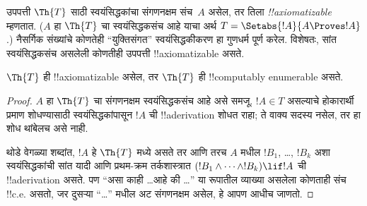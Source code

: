\documentclass[../../../include/open-logic-section]{subfiles}
\begin{document}


उपपत्ती $\Th{T}$ साठी स्वयंसिद्धकांचा संगणनक्षम संच~$A$ असेल,
तर तिला \emph{!!{axiomatizable}} म्हणतात.
($A$ हा $\Th{T}$ चा स्वयंसिद्धकसंच आहे याचा अर्थ
$T = \Setabs{!A}{A \Proves !A}$.) नैसर्गिक संख्यांचे कोणतेही
``युक्तिसंगत'' स्वयंसिद्धकीकरण हा गुणधर्म पूर्ण करेल.
विशेषतः, सांत स्वयंसिद्धकसंच असलेली कोणतीही उपपत्ती
!!{axiomatizable} असते.

\begin{lem}
$\Th{T}$ ही !!{axiomatizable} असेल, तर $\Th{T}$ ही
!!{computably
enumerable} असते.
\end{lem}

\begin{proof}
$A$ हा $\Th{T}$ चा संगणनक्षम स्वयंसिद्धकसंच आहे असे समजू.
$!A \in T$ असल्याचे होकारार्थी प्रमाण शोधण्यासाठी
स्वयंसिद्धकांपासून $!A$ ची !!a{derivation} शोधत राहा;
ते वाक्य सदस्य नसेल, तर हा शोध थांबेलच असे नाही.

थोडे वेगळ्या शब्दांत, $!A$ हे $\Th{T}$ मध्ये असते तर आणि तरच $A$ मधील $!B_1$, \dots, $!B_k$ अशा स्वयंसिद्धकांची
सांत यादी आणि प्रथम-क्रम तर्कशास्त्रात
$(!B_1 \land \dots \land !B_k) \lif !A$ ची
!!a{derivation} असते. पण ``असा काही \dots आहे की \dots''
या रूपातील व्याख्या असलेला कोणताही संच !!{c.e.} असतो,
जर दुसऱ्या ``\dots'' मधील अट संगणनक्षम असेल, हे आपण आधीच जाणतो.
\end{proof}
\end{document}
